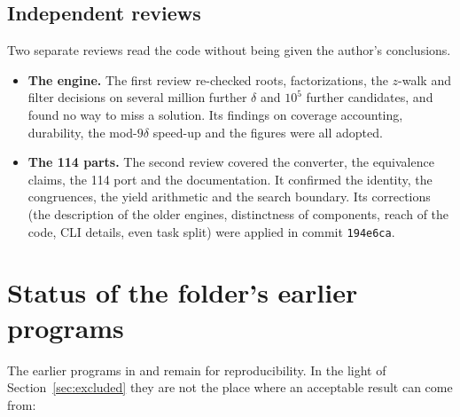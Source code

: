 \documentclass[11pt,a4paper]{article}
\theoremstyle{remark}
\newcommand{\code}[1]{\path{#1}}
\begin{document}
\subsection{Independent reviews}
Two separate reviews read the code without being given the author's conclusions.
\begin{itemize}[leftmargin=*]
  \item \textbf{The engine.} The first review re-checked roots, factorizations, the $z$-walk
  and filter decisions on several million further $\delta$ and $10^5$ further candidates,
  and found no way to miss a solution. Its findings on coverage accounting, durability, the
  mod-$9\delta$ speed-up and the figures were all adopted.
  \item \textbf{The 114 parts.} The second review covered the converter, the equivalence
  claims, the 114 port and the documentation. It confirmed the identity, the congruences, the
  yield arithmetic and the search boundary. Its corrections (the description of the older
  engines, distinctness of components, reach of the code, CLI details, even task split) were
  applied in commit \texttt{194e6ca}.
\end{itemize}

\section{Status of the folder's earlier programs}\label{sec:older}

The earlier programs in \code{grid/} and \code{search/} remain for reproducibility. In the
light of Section~\ref{sec:excluded} they are not the place where an acceptable result can
come from:
\end{document}
